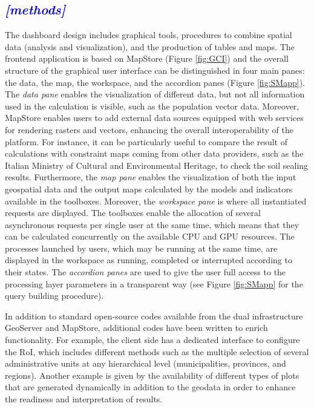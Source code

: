 \documentclass[APA,LATO1COL,doublespace]{WileyNJD-v2}
\newcommand{\update}[1]{\emph{\textcolor{blue}{#1}}}     %
\begin{document}
\subsection{ \update{[methods]}} %
The dashboard design includes graphical tools, procedures to combine spatial data (analysis and visualization), and the production of tables and maps. 
The frontend application is based on MapStore (Figure \ref{fig:GCI}) and the overall structure of the graphical user interface can be distinguished in four main panes: the data, the map, the workspace, and the accordion panes (Figure \ref{fig:SMapp}).
The \textit{data pane} enables the visualization of different data, but not all information used in the calculation is visible, such as the population vector data. 
Moreover, MapStore enables users to add external data sources equipped with web services for rendering rasters and vectors, enhancing the overall interoperability of the platform. 
For instance, it can be particularly useful to compare the result of calculations with constraint maps coming from other data providers, such as the Italian Ministry of Cultural and Environmental Heritage, to check the soil sealing results. Furthermore, the \textit{map pane} enables the visualization of both the input geospatial data and the output maps calculated by the models and indicators available in the toolboxes. 
Moreover, the \textit{workspace pane} is where all instantiated requests are displayed. 
The toolboxes enable the allocation of several asynchronous requests per single user at the same time, which means that they can be calculated concurrently on the available CPU and GPU resources. 
The processes launched by users, which may be running at the same time, are displayed in the workspace as running, completed or interrupted according to their states. 
The \textit{accordion panes} are used to give the user full access to the processing layer parameters in a transparent way (see Figure \ref{fig:SMapp} for the query building procedure).

In addition to standard open-source codes available from the dual infrastructure GeoServer and MapStore, additional codes have been written to enrich functionality. 
For example, the client side has a dedicated interface to configure the RoI, which includes different methods such as the multiple selection of several administrative units at any hierarchical level (municipalities, provinces, and regions). 
Another example is given by the availability of different types of plots that are generated dynamically in addition to the geodata in order to enhance the readiness and interpretation of results.
\end{document}
